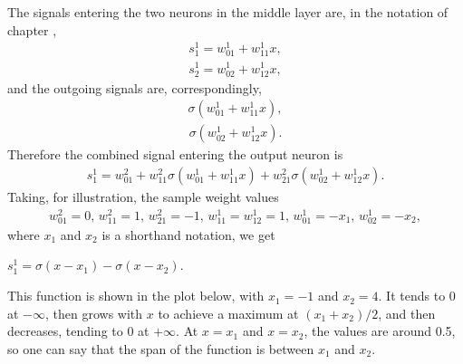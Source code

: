 \documentclass[letterpaper,10pt,english]{jupyterBook}
\begin{document}
\noindent{}

\sphinxAtStartPar
The signals entering the two neurons in the middle layer are, in the notation of chapter {\hyperref[\detokenize{docs/more_layers:more-lab}]{}},
\begin{equation*}
\begin{split}s_1^{1}=w_{01}^{1}+w_{11}^{1} x, \end{split}
\end{equation*}\begin{equation*}
\begin{split}s_2^{1}=w_{02}^{1}+w_{12}^{1} x, \end{split}
\end{equation*}
\sphinxAtStartPar
and the outgoing signals are, correspondingly,
\begin{equation*}
\begin{split}\sigma \left( w_{01}^{1}+w_{11}^{1} x \right), \end{split}
\end{equation*}\begin{equation*}
\begin{split}\sigma \left( w_{02}^{1}+w_{12}^{1} x \right). \end{split}
\end{equation*}
\sphinxAtStartPar
Therefore the combined signal entering the output neuron is
\begin{equation*}
\begin{split}s_1^{1}=w_{01}^{2}+ w_{11}^{2}\sigma \left( w_{01}^{1}+w_{11}^{1} x \right)
+  w_{21}^{2}\sigma \left( w_{02}^{1}+w_{12}^{1} x \right). \end{split}
\end{equation*}
\sphinxAtStartPar
Taking, for illustration, the sample weight values
\begin{equation*}
\begin{split}w_{01}^{2}=0, \, w_{11}^{2}=1, \, w_{21}^{2}=-1, \,
w_{11}^{1}=w_{12}^{1}=1, \, w_{01}^{1}=-x_1,  \, w_{02}^{1}=-x_2, \end{split}
\end{equation*}
\sphinxAtStartPar
where \(x_1\) and \(x_2\) is a short\sphinxhyphen{}hand notation, we get

\sphinxAtStartPar
\(s_1^{1}=\sigma(x-x_1)-\sigma(x-x_2)\).

\sphinxAtStartPar
This function is shown in the plot below, with \(x_1=-1\) and \(x_2=4\).
It tends to 0 at \(- \infty\), then grows with \(x\) to achieve a maximum at
\((x_1+x_2)/2\), and then decreases, tending to 0 at \(+\infty\). At \(x=x_1\) and \(x=x_2\), the values are around 0.5, so one can say that the span of the function is between \(x_1\) and \(x_2\).
\end{document}
